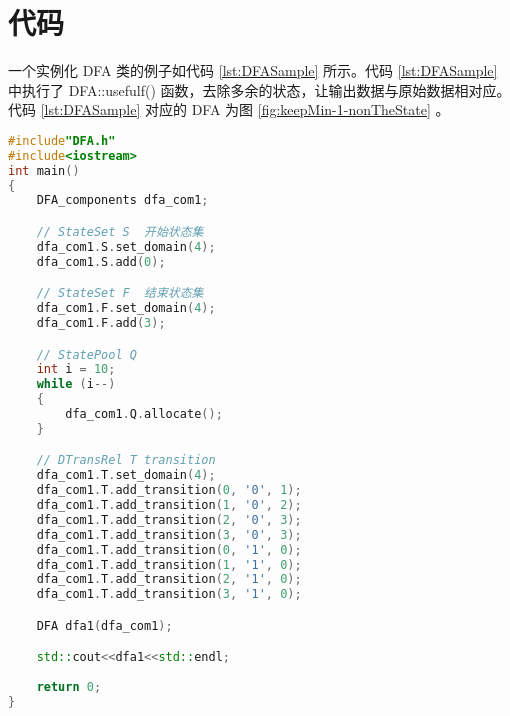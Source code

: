\chapter{代码}

一个实例化 DFA 类的例子如代码 \ref{lst:DFASample} 所示。代码 \ref{lst:DFASample} 中执行了 DFA::usefulf() 函数，去除多余的状态，让输出数据与原始数据相对应。代码 \ref{lst:DFASample} 对应的 DFA 为图 \ref{fig:keepMin-1-nonTheState} 。


\lstset{style=mystyle}
\begin{lstlisting}[language=C++,label={lst:DFASample},caption={实例化DFA示例}]
#include"DFA.h"
#include<iostream>
int main()
{
    DFA_components dfa_com1;

    // StateSet S  开始状态集
    dfa_com1.S.set_domain(4);
    dfa_com1.S.add(0);

    // StateSet F  结束状态集
    dfa_com1.F.set_domain(4);
    dfa_com1.F.add(3);

    // StatePool Q 
    int i = 10;
    while (i--)
    {
        dfa_com1.Q.allocate();
    }

    // DTransRel T transition             
    dfa_com1.T.set_domain(4);
    dfa_com1.T.add_transition(0, '0', 1);
    dfa_com1.T.add_transition(1, '0', 2);
    dfa_com1.T.add_transition(2, '0', 3);
    dfa_com1.T.add_transition(3, '0', 3);
    dfa_com1.T.add_transition(0, '1', 0);
    dfa_com1.T.add_transition(1, '1', 0);
    dfa_com1.T.add_transition(2, '1', 0);
    dfa_com1.T.add_transition(3, '1', 0);

    DFA dfa1(dfa_com1);

    std::cout<<dfa1<<std::endl;
	
    return 0;
}
\end{lstlisting}
